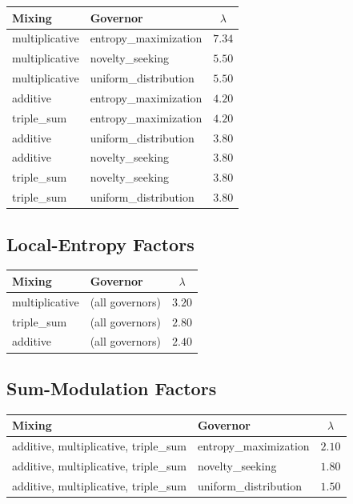 \documentclass[12pt,a4paper]{article}
\begin{document}
\begin{center}
\begin{tabular}{llc}
\toprule
Mixing & Governor & $\lambda$ \\
\midrule
multiplicative & entropy\_maximization  & $7.34$ \\
multiplicative & novelty\_seeking       & $5.50$ \\
multiplicative & uniform\_distribution  & $5.50$ \\
additive       & entropy\_maximization  & $4.20$ \\
triple\_sum    & entropy\_maximization  & $4.20$ \\
additive       & uniform\_distribution  & $3.80$ \\
additive       & novelty\_seeking       & $3.80$ \\
triple\_sum    & novelty\_seeking       & $3.80$ \\
triple\_sum    & uniform\_distribution  & $3.80$ \\
\bottomrule
\end{tabular}
\end{center}

\subsection{Local-Entropy Factors}

\begin{center}
\begin{tabular}{llc}
\toprule
Mixing & Governor & $\lambda$ \\
\midrule
multiplicative & (all governors) & $3.20$ \\
triple\_sum    & (all governors) & $2.80$ \\
additive       & (all governors) & $2.40$ \\
\bottomrule
\end{tabular}
\end{center}

\subsection{Sum-Modulation Factors}

\begin{center}
\begin{tabular}{llc}
\toprule
Mixing & Governor & $\lambda$ \\
\midrule
additive, multiplicative, triple\_sum & entropy\_maximization & $2.10$ \\
additive, multiplicative, triple\_sum & novelty\_seeking      & $1.80$ \\
additive, multiplicative, triple\_sum & uniform\_distribution & $1.50$ \\
\bottomrule
\end{tabular}
\end{center}
\end{document}

